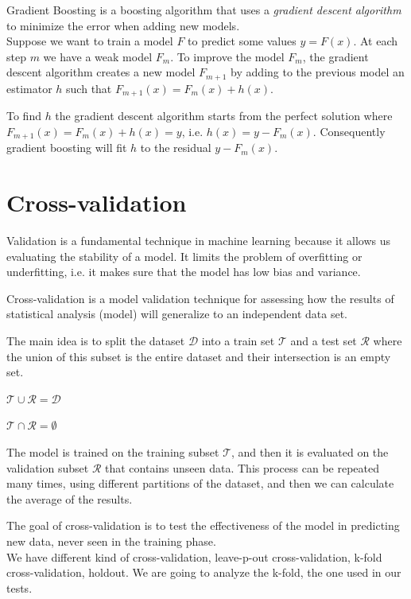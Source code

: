 Gradient Boosting is a boosting algorithm that uses a \textit{gradient descent algorithm} to minimize the error when adding new models.\\

Suppose we want to train a model $F$ to predict some values $y = F(x)$. At each step $m$ we have a weak model $F_m$. To improve the model $F_m$, the gradient descent algorithm creates a new model $F_{m+1}$ by adding to the previous model an estimator $h$ such that $F_{m+1}(x) = F_m(x) + h(x)$. \cite{gradientBoostLi}

To find $h$ the gradient descent algorithm starts from the perfect solution where $F_{m+1}(x) = F_m(x) + h(x) = y$, i.e. $h(x) = y - F_m(x)$. Consequently gradient boosting will fit $h$ to the residual $y - F_m(x)$.


\section{Cross-validation}
\label{sec:cv}

Validation is a fundamental technique in machine learning because it allows us evaluating the stability of a model. It limits the problem of overfitting or underfitting, i.e. it makes sure that  the model has low bias and variance.

Cross-validation is a model validation technique for assessing how the results of statistical analysis (model) will generalize to an independent data set.

The main idea is to split the dataset $\mathcal{D}$ into a train set $\mathcal{T}$ and a test set $\mathcal{R}$ where the union of this subset is the entire dataset and their intersection is an empty set. \cite{ghojogh2019theory}

 $\mathcal{T} \cup \mathcal{R} = \mathcal{D} $
 
 $\mathcal{T} \cap \mathcal{R} = \emptyset $
 

The model is trained on the training subset $\mathcal{T}$, and then it is evaluated on the validation subset $\mathcal{R}$ that contains unseen data.
This process can be repeated many times, using different partitions of the dataset, and then we can calculate the average of the results.

The goal of cross-validation is to test the effectiveness of the model in predicting new data, never seen in the training phase.\\

We have different kind of cross-validation, leave-p-out cross-validation, k-fold cross-validation, holdout. We are going to analyze the k-fold, the one used in our tests.





